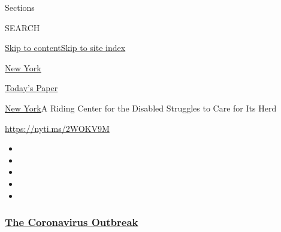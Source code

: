 Sections

SEARCH

\protect\hyperlink{site-content}{Skip to
content}\protect\hyperlink{site-index}{Skip to site index}

\href{https://www.nytimes3xbfgragh.onion/section/nyregion}{New York}

\href{https://myaccount.nytimes3xbfgragh.onion/auth/login?response_type=cookie\&client_id=vi}{}

\href{https://www.nytimes3xbfgragh.onion/section/todayspaper}{Today's
Paper}

\href{/section/nyregion}{New York}\textbar{}A Riding Center for the
Disabled Struggles to Care for Its Herd

\url{https://nyti.ms/2WOKV9M}

\begin{itemize}
\item
\item
\item
\item
\item
\end{itemize}

\hypertarget{the-coronavirus-outbreak}{%
\subsubsection{\texorpdfstring{\href{https://www.nytimes3xbfgragh.onion/news-event/coronavirus?name=styln-coronavirus-national\&region=TOP_BANNER\&block=storyline_menu_recirc\&action=click\&pgtype=Article\&impression_id=de71e870-f1f5-11ea-b189-9baa8bf07aac\&variant=undefined}{The
Coronavirus
Outbreak}}{The Coronavirus Outbreak}}\label{the-coronavirus-outbreak}}

